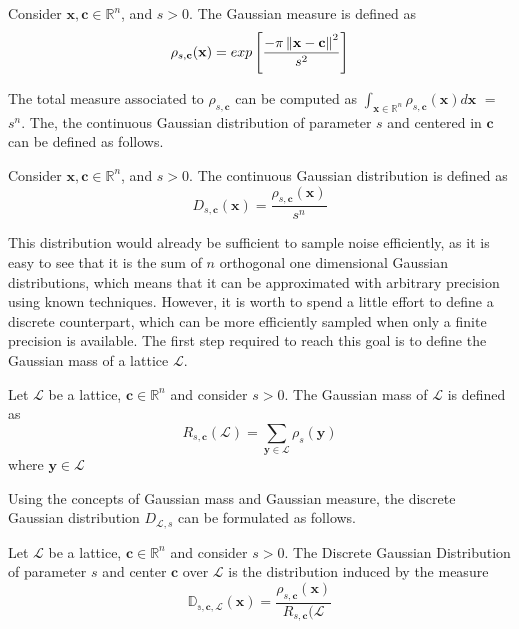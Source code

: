 \begin{definition}
Consider $\mathbf{x},\mathbf{c}\in\mathbb{R}^n$, and $s>0$. The Gaussian measure is defined as
\begin{equation*}
\rho_{s,\mathbf{c}}(\mathbf{x}) = exp\left[\frac{-\pi\left\lVert \mathbf{x}-\mathbf{c} \right\rVert^2}{s^2}\right]
\end{equation*}
\end{definition}

The total measure associated to $\rho_{s,\mathbf{c}}$ can be computed as $\int_{\mathbf{x}\in\mathbb{R}^n}\rho_{s,\mathbf{c}}(\mathbf{x})d\mathbf{x}$ $=$ $s^n$. The, the continuous Gaussian distribution of parameter $s$ and centered in $\mathbf{c}$ can be defined as follows.

\begin{definition}
Consider $\mathbf{x},\mathbf{c}\in\mathbb{R}^n$, and $s>0$. The continuous Gaussian distribution is defined as
\begin{equation*}
D_{s,\mathbf{c}}(\mathbf{x})=\frac{\rho_{s,\mathbf{c}}(\mathbf{x})}{s^n}
\end{equation*}
\end{definition}

This distribution would already be sufficient to sample noise efficiently, as it is easy to see that it is the sum of $n$ orthogonal one dimensional Gaussian distributions, which means that it can be approximated with arbitrary precision using known techniques. However, it is worth to spend a little effort to define a discrete counterpart, which can be more efficiently sampled when only a finite precision is available. The first step required to reach this goal is to define the Gaussian mass of a lattice $\mathscr{L}$.

\begin{definition}
Let $\mathscr{L}$ be a lattice, $\mathbf{c}\in\mathbb{R}^n$ and consider $s>0$. The Gaussian mass of $\mathscr{L}$ is defined as
\begin{equation*}
R_{s,\mathbf{c}}(\mathscr{L})=\sum_{\mathbf{y}\in\mathscr{L}}\rho_s(\mathbf{y})
\end{equation*}
where $\mathbf{y}\in\mathscr{L}$
\end{definition}

Using the concepts of Gaussian mass and Gaussian measure, the discrete Gaussian distribution $D_{\mathscr{L},s}$ can be formulated as follows.

\begin{definition}
Let $\mathscr{L}$ be a lattice, $\mathbf{c}\in\mathbb{R}^n$ and consider $s>0$. The Discrete Gaussian Distribution of parameter $s$ and center $\mathbf{c}$ over $\mathscr{L}$ is the distribution induced by the measure
\begin{equation*}
\mathbb{D_{s,\mathbf{c},\mathscr{L}}}(\mathbf{x})= \frac{\rho_{s,\mathbf{c}}(\mathbf{x})}{R_{s,\mathbf{c}}(\mathscr{L}}
\end{equation*}
\end{definition}

